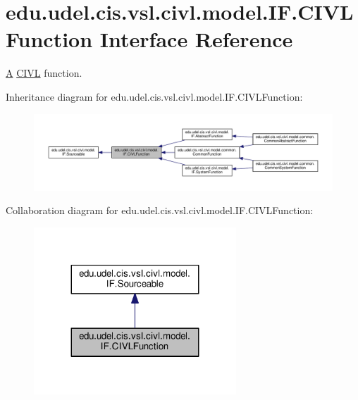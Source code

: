 \hypertarget{interfaceedu_1_1udel_1_1cis_1_1vsl_1_1civl_1_1model_1_1IF_1_1CIVLFunction}{}\section{edu.\+udel.\+cis.\+vsl.\+civl.\+model.\+I\+F.\+C\+I\+V\+L\+Function Interface Reference}
\label{interfaceedu_1_1udel_1_1cis_1_1vsl_1_1civl_1_1model_1_1IF_1_1CIVLFunction}


\hyperlink{structA}{A} \hyperlink{classedu_1_1udel_1_1cis_1_1vsl_1_1civl_1_1CIVL}{C\+I\+V\+L} function.  




Inheritance diagram for edu.\+udel.\+cis.\+vsl.\+civl.\+model.\+I\+F.\+C\+I\+V\+L\+Function\+:
\nopagebreak
\begin{figure}[H]
\begin{center}
\leavevmode
\includegraphics[width=350pt]{interfaceedu_1_1udel_1_1cis_1_1vsl_1_1civl_1_1model_1_1IF_1_1CIVLFunction__inherit__graph}
\end{center}
\end{figure}


Collaboration diagram for edu.\+udel.\+cis.\+vsl.\+civl.\+model.\+I\+F.\+C\+I\+V\+L\+Function\+:
\nopagebreak
\begin{figure}[H]
\begin{center}
\leavevmode
\includegraphics[width=215pt]{interfaceedu_1_1udel_1_1cis_1_1vsl_1_1civl_1_1model_1_1IF_1_1CIVLFunction__coll__graph}
\end{center}
\end{figure}
